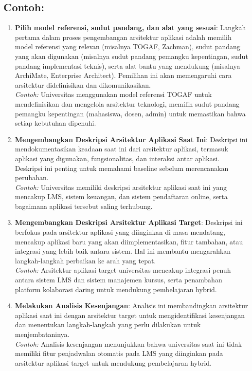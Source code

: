 \subsection*{Contoh:}
\begin{enumerate}
	\item \textbf{Pilih model referensi, sudut pandang, dan alat yang sesuai}: Langkah pertama dalam proses pengembangan arsitektur aplikasi adalah memilih model referensi yang relevan (misalnya TOGAF, Zachman), sudut pandang yang akan digunakan (misalnya sudut pandang pemangku kepentingan, sudut pandang implementasi teknis), serta alat bantu yang mendukung (misalnya ArchiMate, Enterprise Architect). Pemilihan ini akan memengaruhi cara arsitektur didefinisikan dan dikomunikasikan.
	\\
	\textit{Contoh:} Universitas menggunakan model referensi TOGAF untuk mendefinisikan dan mengelola arsitektur teknologi, memilih sudut pandang pemangku kepentingan (mahasiswa, dosen, admin) untuk memastikan bahwa setiap kebutuhan dipenuhi.
	
	\item \textbf{Mengembangkan Deskripsi Arsitektur Aplikasi Saat Ini}: Deskripsi ini mendokumentasikan keadaan saat ini dari arsitektur aplikasi, termasuk aplikasi yang digunakan, fungsionalitas, dan interaksi antar aplikasi. Deskripsi ini penting untuk memahami baseline sebelum merencanakan perubahan.
	\\
	\textit{Contoh:} Universitas memiliki deskripsi arsitektur aplikasi saat ini yang mencakup LMS, sistem keuangan, dan sistem pendaftaran online, serta bagaimana aplikasi tersebut saling terhubung.
	
	\item \textbf{Mengembangkan Deskripsi Arsitektur Aplikasi Target}: Deskripsi ini berfokus pada arsitektur aplikasi yang diinginkan di masa mendatang, mencakup aplikasi baru yang akan diimplementasikan, fitur tambahan, atau integrasi yang lebih baik antara sistem. Hal ini membantu mengarahkan langkah-langkah perbaikan ke arah yang tepat.
	\\
	\textit{Contoh:} Arsitektur aplikasi target universitas mencakup integrasi penuh antara sistem LMS dan sistem manajemen kursus, serta penambahan platform kolaborasi daring untuk mendukung pembelajaran hybrid.
	
	\item \textbf{Melakukan Analisis Kesenjangan}: Analisis ini membandingkan arsitektur aplikasi saat ini dengan arsitektur target untuk mengidentifikasi kesenjangan dan menentukan langkah-langkah yang perlu dilakukan untuk menjembataninya.
	\\
	\textit{Contoh:} Analisis kesenjangan menunjukkan bahwa universitas saat ini tidak memiliki fitur penjadwalan otomatis pada LMS yang diinginkan pada arsitektur aplikasi target untuk mendukung pembelajaran hybrid.
	

\end{enumerate}
